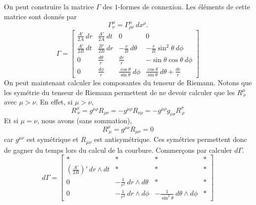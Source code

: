 \documentclass[a4paper,11pt]{report}
\theoremstyle{definition}
\theoremstyle{plain}
\theoremstyle{definition}
\theoremstyle{remark}
\begin{document}
        On peut construire la matrice $\Gamma$ des $1$-formes de connexion. Les éléments de cette matrice sont donnés par 
        \begin{equation}
            \Gamma^\mu_\nu = \Gamma^\mu_{\rho\nu}~dx^\rho.
        \end{equation}
        \begin{equation}
            \Gamma = 
            \begin{bmatrix}
                \frac{A'}{2A}~dr & \frac{A'}{2A}~dt & 0 & 0\\
                \frac{A'}{2B}~dt & \frac{B'}{2B}~dr & -\frac{r}{B}~d\theta & -\frac{r}{B}\sin^2\theta~d\phi \\
                0 & \frac{d\theta}{r} & \frac{dr}{r} & -\sin\theta\cos\theta~d\phi\\
                0 & \frac{d\phi}{r} & \frac{\cos\theta}{\sin\theta}~d\phi & \frac{\cos\theta}{\sin\theta}~d\theta+\frac{dr}{r}
            \end{bmatrix}
        \end{equation}
        On peut maintenant calculer les composantes du tenseur de Riemann. Notons que les symétrie du tenseur de Riemann permettent de ne devoir calculer que les $R^\mu_{~\nu}$ avec $\mu>\nu$. En effet, si $\mu>\nu$,
        \begin{equation}
            R^\mu_{~\nu} = g^{\mu\rho}R_{\rho\nu} = -g^{\mu\rho}R_{\nu\rho} =  -g^{\mu\rho}g_{\nu\sigma}R^\sigma_{~\rho}
        \end{equation}
        Et si $\mu=\nu$, nous avons (sans sommation),
        \begin{equation}
            R^\mu_{~\mu} = g^{\mu\nu}R_{\mu\nu} = 0
        \end{equation}
        car $g^{\mu\nu}$ est symétrique et $R_{\mu\nu}$ est antisymétrique. Ces symétries permettent donc de gagner du temps lors du calcul de la courbure. Commerçons par calculer $d\Gamma$. 
        \begin{equation}
            d\Gamma=
            \begin{bmatrix}
                * & * & * & * \\
                \left( \frac{A'}{2B} \right)'~dr\wedge dt & * & * & * \\
                0 & -\frac{1}{r^2}~dr\wedge d\theta & * & * \\
                0 & -\frac{1}{r^2}~dr\wedge d\phi & -\frac{1}{\sin^2\theta}~d\theta\wedge d\phi & *
            \end{bmatrix}
        \end{equation}
\end{document}
